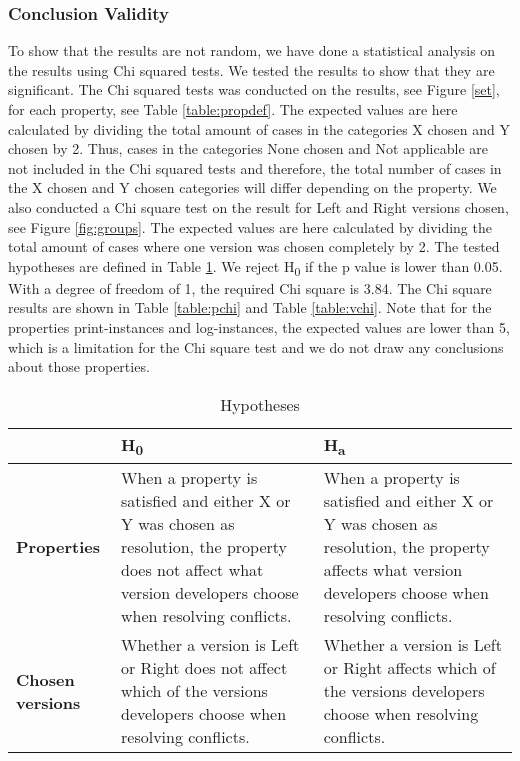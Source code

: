 \subsubsection{Conclusion Validity}
To show that the results are not random, we have done a statistical analysis on the results using Chi squared tests. We tested the results to show that they are significant. The Chi squared tests was conducted on the results, see Figure \ref{set}, for each property, see Table \ref{table:propdef}. The expected values are here calculated by dividing the total amount of cases in the categories X chosen and Y chosen by 2. Thus, cases in the categories None chosen and Not applicable are not included in the Chi squared tests and therefore, the total number of cases in the X chosen and Y chosen categories will differ depending on the property. We also conducted a Chi square test on the result for Left and Right versions chosen, see Figure \ref{fig:groups}. The expected values are here calculated by dividing the total amount of cases where one version was chosen completely by 2. The tested hypotheses are defined in Table \ref{table:hypotheses}. We reject H\textsubscript{0} if the p value is lower than 0.05. With a degree of freedom of 1, the required Chi square is 3.84. The Chi square results are shown in Table \ref{table:pchi} and Table \ref{table:vchi}. Note that for the properties print-instances and log-instances, the expected values are lower than 5, which is a limitation for the Chi square test and we do not draw any conclusions about those properties.

\begin{table}[htbp]
\caption{Hypotheses}
\label{table:hypotheses}
\begin{tabular}{|l|p{6cm}|p{6cm}|}
\hline
& \textbf{H\textsubscript{0}} & \textbf{H\textsubscript{a}}\\
\hline
\textbf{Properties} & When a property is satisfied and either X or Y was chosen as resolution, the property does not affect what version developers choose when resolving conflicts. & When a property is satisfied and either X or Y was chosen as resolution, the property affects what version developers choose when resolving conflicts.\\
\hline
\textbf{Chosen versions} & Whether a version is Left or Right does not affect which of the versions developers choose when resolving conflicts. & Whether a version is Left or Right affects which of the versions developers choose when resolving conflicts.\\
\hline
\end{tabular}
\end{table}

